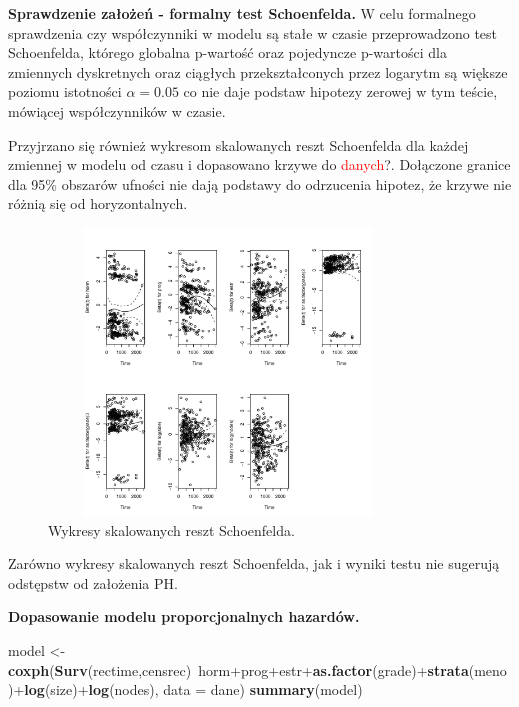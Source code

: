 \documentclass[]{article}
\newenvironment{Shaded}{}{}
\newcommand{\KeywordTok}[1]{\textcolor[rgb]{0.00,0.44,0.13}{\textbf{{#1}}}}
\newcommand{\DataTypeTok}[1]{\textcolor[rgb]{0.56,0.13,0.00}{{#1}}}
\newcommand{\StringTok}[1]{\textcolor[rgb]{0.25,0.44,0.63}{{#1}}}
\newcommand{\NormalTok}[1]{{#1}}
\begin{document}
\textbf{Sprawdzenie założeń - formalny test Schoenfelda.} \newline
W celu formalnego sprawdzenia czy współczynniki w modelu są stałe w
czasie przeprowadzono test Schoenfelda, którego globalna p-wartość oraz
pojedyncze p-wartości dla zmiennych dyskretnych oraz ciągłych
przekształconych przez logarytm są większe  poziomu
istotności \(\alpha=0.05\) co nie daje podstaw 
hipotezy zerowej w tym teście, mówiącej  współczynników
w czasie.

Przyjrzano się również wykresom skalowanych reszt Schoenfelda dla każdej
zmiennej w modelu od czasu i dopasowano krzywe do
\textcolor{red}{danych}?. Dołączone granice dla 95\% obszarów ufności
nie dają podstawy do odrzucenia hipotez, że krzywe nie różnią się od
horyzontalnych.

\begin{figure}[hbt!]
\vspace{-10pt}
  \begin{center}
      \includegraphics[width=0.85\textwidth, height=3in]{skal_res_shen.pdf}
      \caption{Wykresy skalowanych reszt Schoenfelda.}
   \end{center}
\end{figure}

Zarówno wykresy skalowanych reszt Schoenfelda, jak i wyniki testu nie
sugerują odstępstw od założenia PH.

\textbf{Dopasowanie modelu proporcjonalnych hazardów.} \newline

\begin{Shaded}
\begin{Highlighting}[]
\NormalTok{model <-}\StringTok{ }\KeywordTok{coxph}\NormalTok{(}\KeywordTok{Surv}\NormalTok{(rectime,censrec)~horm+prog+estr+}\KeywordTok{as.factor}\NormalTok{(grade)+}\KeywordTok{strata}\NormalTok{(meno)+}\KeywordTok{log}\NormalTok{(size)+}\KeywordTok{log}\NormalTok{(nodes), }
               \DataTypeTok{data =} \NormalTok{dane) }
\KeywordTok{summary}\NormalTok{(model)}
\end{Highlighting}
\end{Shaded}
\end{document}
